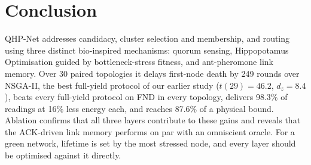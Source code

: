 \documentclass[conference]{IEEEtran}
\newcommand{\fndfrac}{87.6}
\begin{document}
\section{Conclusion}
QHP-Net addresses candidacy, cluster selection and membership, and routing using three distinct bio-inspired mechanisms: quorum sensing, Hippopotamus Optimisation guided by bottleneck-stress fitness, and ant-pheromone link memory. Over 30 paired topologies it delays first-node death by 249 rounds over NSGA-II, the best full-yield protocol of our earlier study ($t(29)=46.2$, $d_z=8.4$), beats every full-yield protocol on FND in every topology, delivers 98.3\% of readings at 16\% less energy each, and reaches \fndfrac\% of a physical bound. Ablation confirms that all three layers contribute to these gains and reveals that the ACK-driven link memory performs on par with an omniscient oracle. For a green network, lifetime is set by the most stressed node, and every layer should be optimised against it directly.



\end{document}
